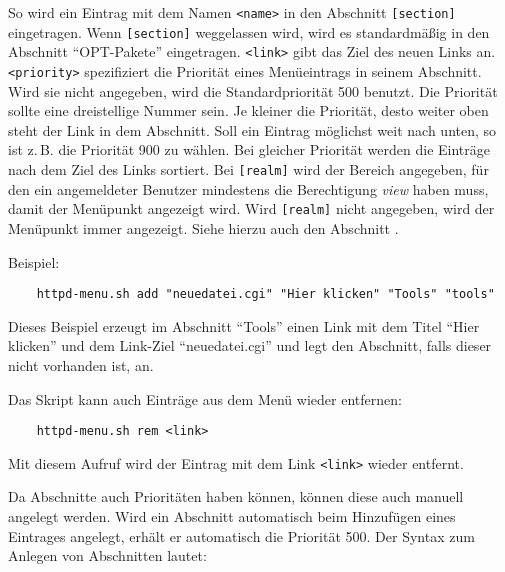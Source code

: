 So wird ein Eintrag mit dem Namen \texttt{<name>} in den Abschnitt
\texttt{[section]} eingetragen. Wenn \texttt{[section]} weggelassen wird, wird
es standardmäßig in den Abschnitt "`OPT-Pakete"' eingetragen. \texttt{<link>}
gibt das Ziel des neuen Links an. \texttt{<priority>} spezifiziert die Priorität
eines Menüeintrags in seinem Abschnitt. Wird sie nicht angegeben, wird die
Standardpriorität 500 benutzt. Die Priorität sollte eine dreistellige Nummer
sein. Je kleiner die Priorität, desto weiter oben steht der Link in dem
Abschnitt. Soll ein Eintrag möglichst weit nach unten, so ist z.\,B. die Priorität
900 zu wählen. Bei gleicher Priorität werden die Einträge nach dem Ziel des
Links sortiert. Bei \texttt{[realm]} wird der Bereich angegeben, für den ein
angemeldeter Benutzer mindestens die Berechtigung \emph{view} haben muss, damit
der Menüpunkt angezeigt wird. Wird \texttt{[realm]} nicht angegeben, wird der
Menüpunkt immer angezeigt. Siehe hierzu auch den Abschnitt
.

Beispiel:

\begin{example}
\begin{verbatim}
    httpd-menu.sh add "neuedatei.cgi" "Hier klicken" "Tools" "tools"
\end{verbatim}
\end{example}

Dieses Beispiel erzeugt im Abschnitt "`Tools"' einen Link mit dem Titel 
"`Hier klicken"' und dem Link-Ziel "`neuedatei.cgi"' und legt den Abschnitt,
falls dieser nicht vorhanden ist, an.

Das Skript kann auch Einträge aus dem Menü wieder entfernen:

\begin{example}
\begin{verbatim}
    httpd-menu.sh rem <link>
\end{verbatim}
\end{example}

Mit diesem Aufruf wird der Eintrag mit dem Link \texttt{<link>} wieder
entfernt.


Da Abschnitte auch Prioritäten haben können, können diese auch manuell angelegt
werden. Wird ein Abschnitt automatisch beim Hinzufügen eines Eintrages
angelegt, erhält er automatisch die Priorität 500. Der Syntax zum Anlegen von
Abschnitten lautet:

